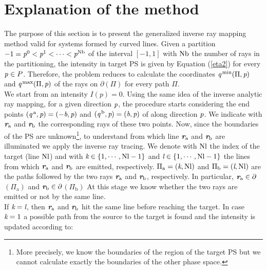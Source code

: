 \section{Explanation of the method}\label{sec:raymapping_explanation}
The purpose of this section is to present the generalized inverse ray mapping method valid for systems formed by curved lines. 
Given a partition $-1 = \textit{p}^0<\textit{p}^1<\cdots<\textit{p}^{\textrm{Nb}}$ of the interval $[-1,1]$ with $\textrm{Nb}$ the number of rays in the partitioning, the intensity in target PS is given by Equation (\ref{eta2}) for every $\textit{p}_{\textrm{} \textit{}}\in P$.
Therefore, the problem reduces to calculate the coordinates 
$\textit{q}^{\textrm{\,min}}(\Pi, \textit{p})$ and $\textit{q}^{\textrm{\,max}}(\Pi, \textit{p})$ of the rays on $\partial$$(\Pi)$ for every path $\Pi$.\\ \indent 
We start from an intensity $I(p)=0$. Using the same idea of the inverse analytic ray mapping, for a given direction $\textit{p}$, the procedure starts considering the end points $(\textit{q}^{\,\textrm{a}}, \textit{p})= (-\textit{b}, \textit{p})$ and $(\textit{q}^{\,\textrm{b}}, \textit{p}) = (\textit{b}, \textit{p})$ of  along direction $\textit{p}$. We indicate with $\textit{\textbf{r}}_{\textrm{a}}$ and $\textit{\textbf{r}}_{\textrm{b}}$ the corresponding rays of these two points. Now, since the boundaries of the PS are unknown\footnote{More precisely, we know the boundaries of the region of the target PS but we cannot calculate exactly the boundaries of the other phase space.}, to understand from which line $\textit{\textbf{r}}_{\textrm{a}}$ and $\textit{\textbf{r}}_{\textrm{b}}$ are illuminated we apply the inverse ray tracing. We denote with $\textrm{Nl}$ the index of the target (line $\textrm{Nl}$) and with $\textit{k}\in\{1,\cdots, \textrm{Nl}-1\}$ and $\textit{l}\in\{1,\cdots, \textrm{Nl}-1\}$ the lines from which $\textit{\textbf{r}}_{\textrm{a}}$ and $\textit{\textbf{r}}_{\textrm{b}}$ are emitted, respectively. $\Pi_\textrm{a} = (\textit{k}, \textrm{Nl})$ and $\Pi_\textrm{b} = (\textit{l},\textrm{Nl})$ are the paths followed by the two rays $\textit{\textbf{r}}_{\textrm{a}}$ and $\textit{\textbf{r}}_{\textrm{b}}$, respectively. In particular, $\textit{\textbf{r}}_{\textrm{a}}\in\partial$$(\Pi_{\textrm{a}})$ and $\textit{\textbf{r}}_{\textrm{b}}\in\partial$$(\Pi_{\textrm{b}})$ At this stage we know whether the two rays are emitted or not by the same line. \\ \indent 
If $\textit{k}= \textit{l}$, then $\textit{\textbf{r}}_{\textrm{a}}$ and $\textit{\textbf{r}}_{\textrm{b}}$ hit the same line before reaching the target. 
In case $\textit{k} = 1$ a possible path from the source to the target is found and the intensity is updated according to:
